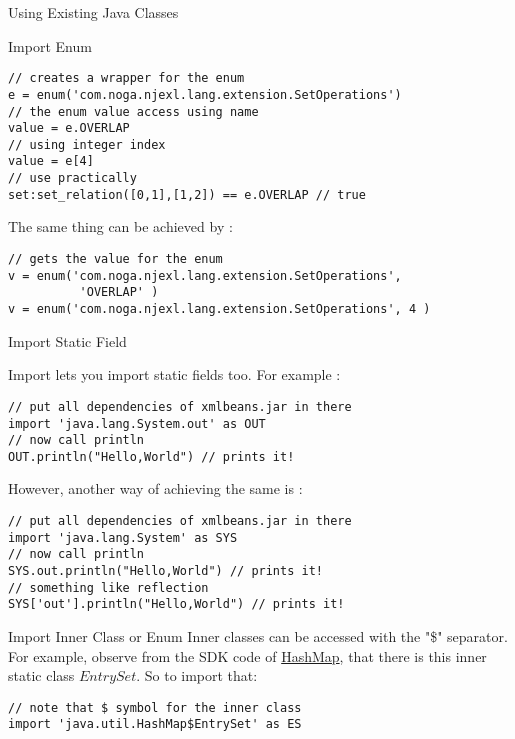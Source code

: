 \begin{section}{Using Existing Java Classes}
\begin{subsection}{Import Enum}
\begin{center}\begin{minipage}{\linewidth}
\begin{lstlisting}[style=JexlStyle]
// creates a wrapper for the enum 
e = enum('com.noga.njexl.lang.extension.SetOperations')
// the enum value access using name 
value = e.OVERLAP
// using integer index 
value = e[4] 
// use practically 
set:set_relation([0,1],[1,2]) == e.OVERLAP // true  
\end{lstlisting}
\end{minipage}\end{center}

The same thing can be achieved by :

\begin{lstlisting}[style=JexlStyle]
// gets the value for the enum 
v = enum('com.noga.njexl.lang.extension.SetOperations', 
          'OVERLAP' )
v = enum('com.noga.njexl.lang.extension.SetOperations', 4 )
\end{lstlisting}

\end{subsection}



\begin{subsection}{Import Static Field}

Import lets you import static fields too. For example :

\begin{lstlisting}[style=JexlStyle]
// put all dependencies of xmlbeans.jar in there
import 'java.lang.System.out' as OUT
// now call println 
OUT.println("Hello,World") // prints it!
\end{lstlisting}

However, another way of achieving the same is :

\begin{lstlisting}[style=JexlStyle]
// put all dependencies of xmlbeans.jar in there
import 'java.lang.System' as SYS
// now call println 
SYS.out.println("Hello,World") // prints it!
// something like reflection
SYS['out'].println("Hello,World") // prints it!
\end{lstlisting}

\end{subsection}

\begin{subsection}{Import Inner Class or Enum}
Inner classes can be accessed with the "\$" separator.
For example, observe from the SDK code of 
\href{http://grepcode.com/file/repository.grepcode.com/java/root/jdk/openjdk/8u40-b25/java/util/HashMap.java/}{HashMap},
that there is this inner static class $EntrySet$. So to import that:

\begin{lstlisting}[style=JexlStyle]
// note that $ symbol for the inner class
import 'java.util.HashMap$EntrySet' as ES
\end{lstlisting}

\end{subsection}

\end{section}

